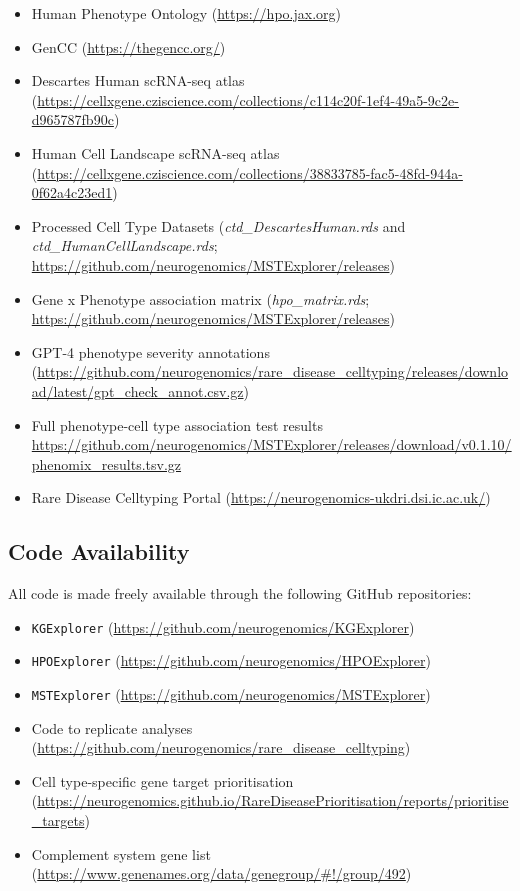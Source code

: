 \documentclass[
]{article}
\providecommand{\tightlist}{%
  \setlength{\itemsep}{0pt}\setlength{\parskip}{0pt}}\usepackage{longtable,booktabs,array}
\begin{document}
\begin{itemize}
\tightlist
\item
  Human Phenotype Ontology (\url{https://hpo.jax.org})
\item
  GenCC (\url{https://thegencc.org/})
\item
  Descartes Human scRNA-seq atlas
  (\url{https://cellxgene.cziscience.com/collections/c114c20f-1ef4-49a5-9c2e-d965787fb90c})
\item
  Human Cell Landscape scRNA-seq atlas
  (\url{https://cellxgene.cziscience.com/collections/38833785-fac5-48fd-944a-0f62a4c23ed1})
\item
  Processed Cell Type Datasets (\emph{ctd\_DescartesHuman.rds} and
  \emph{ctd\_HumanCellLandscape.rds};
  \url{https://github.com/neurogenomics/MSTExplorer/releases})
\item
  Gene x Phenotype association matrix (\emph{hpo\_matrix.rds};
  \url{https://github.com/neurogenomics/MSTExplorer/releases})
\item
  GPT-4 phenotype severity annotations
  (\url{https://github.com/neurogenomics/rare_disease_celltyping/releases/download/latest/gpt_check_annot.csv.gz})
\item
  Full phenotype-cell type association test results
  \url{https://github.com/neurogenomics/MSTExplorer/releases/download/v0.1.10/phenomix_results.tsv.gz}
\item
  Rare Disease Celltyping Portal
  (\url{https://neurogenomics-ukdri.dsi.ic.ac.uk/})
\end{itemize}

\subsection{Code Availability}\label{code-availability}

All code is made freely available through the following GitHub
repositories:

\begin{itemize}
\tightlist
\item
  \texttt{KGExplorer}
  (\url{https://github.com/neurogenomics/KGExplorer})
\item
  \texttt{HPOExplorer}
  (\url{https://github.com/neurogenomics/HPOExplorer})
\item
  \texttt{MSTExplorer}
  (\url{https://github.com/neurogenomics/MSTExplorer})
\item
  Code to replicate analyses
  (\url{https://github.com/neurogenomics/rare_disease_celltyping})
\item
  Cell type-specific gene target prioritisation
  (\url{https://neurogenomics.github.io/RareDiseasePrioritisation/reports/prioritise_targets})
\item
  Complement system gene list
  (\url{https://www.genenames.org/data/genegroup/\#!/group/492})
\end{itemize}
\end{document}
